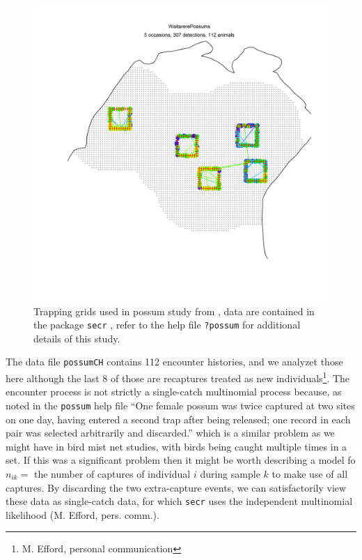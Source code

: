 \begin{figure}
\centering
\includegraphics[width=5in]{Ch5-PoisMn/figs/possum.png}
\caption{Trapping grids used in possum study from
  \citet{efford_etal:2005}, data are contained in the \R
package \mbox{\tt secr}
\citep{efford:2011}, refer to the help file \mbox{\tt ?possum} for
additional details of this study.}
\label{poisson-mn.fig.possum}
\end{figure}

The data file \mbox{\tt possumCH} contains 112 encounter histories,
and we analyzet those here although the last 8 of those are recaptures
treated as new individuals\footnote{M. Efford, personal communication}.
The encounter process is not strictly a single-catch multinomial process because,
as noted in the \mbox{\tt possum} help file
 ``One female possum was twice captured at two
sites on one day, having entered a second trap after being released;
one record in each pair was selected arbitrarily and discarded.''
which is a similar problem as we might have in bird mist net studies,
with birds being caught multiple times in a set.
If this was a significant problem then it might be worth describing a
model fo $n_{ik} = $ the number of captures of individual $i$ during
sample $k$ to make use of all captures. By discarding the two
extra-capture events, we can satisfactorily view these data as
single-catch data, for which \mbox{\tt secr} uses the independent
multinomial likelihood (M. Efford, pers. comm.).

